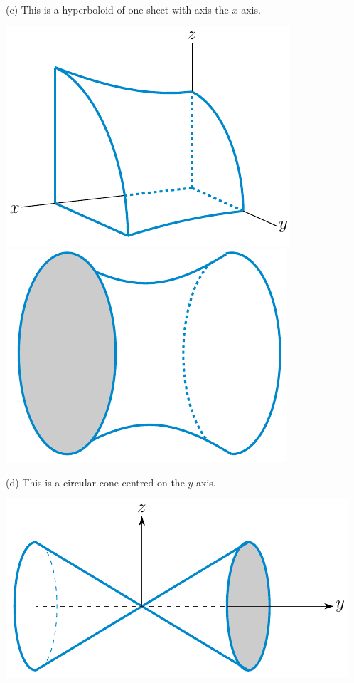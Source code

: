 \begin{answer}
(c)
This is a hyperboloid of one sheet with axis the $x$-axis.
\begin{center}
     \includegraphics{fig/hyperboloidX_l.pdf}\qquad
     \includegraphics[scale=0.9]{fig/hyperboloidX_r.pdf}
\end{center}

(d)
This is a circular cone centred 
on the $y$-axis. 
\begin{center}
     \includegraphics{fig/coneYY_r.pdf}%
\end{center}


\end{answer}
